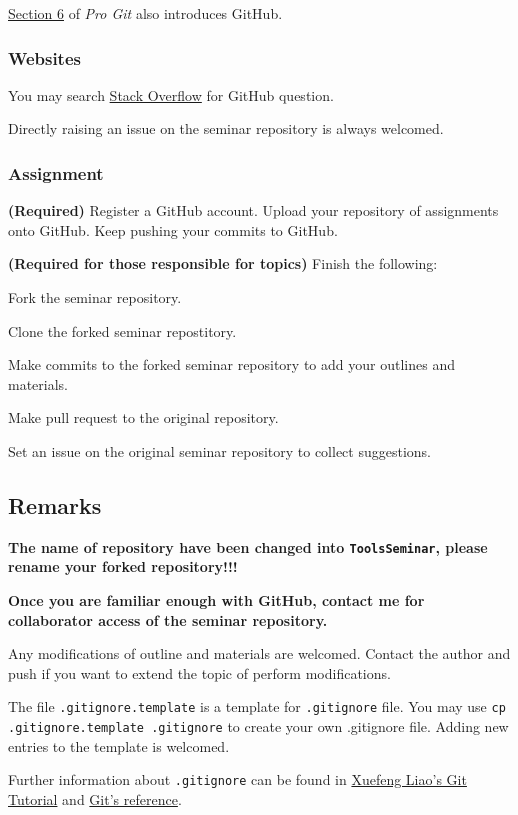 \documentclass[english]{pkupaper}
\begin{document}
\href{https://git-scm.com/book/en/v2/GitHub-Account-Setup-and-Configuration}{Section 6} of \emph{Pro Git} also introduces GitHub.

\subsubsection{Websites}

You may search \href{https://stackoverflow.com/}{Stack Overflow} for GitHub question.

Directly raising an issue on the seminar repository is always welcomed.

\subsubsection{Assignment}

\begin{thmquestion}
\textbf{(Required)} Register a GitHub account. Upload your repository of assignments onto GitHub. Keep pushing your commits to GitHub.
\end{thmquestion}

\begin{thmquestion}
\textbf{(Required for those responsible for topics)} Finish the following:
\begin{partlist}
\item Fork the seminar repository.
\item Clone the forked seminar repostitory.
\item Make commits to the forked seminar repository to add your outlines and materials.
\item Make pull request to the original repository.
\item Set an issue on the original seminar repository to collect suggestions.
\end{partlist}
\end{thmquestion}

\subsection{Remarks}

\textbf{The name of repository have been changed into \texttt{ToolsSeminar}, please rename your forked repository!!!}

\textbf{Once you are familiar enough with GitHub, contact me for collaborator access of the seminar repository.}

Any modifications of outline and materials are welcomed. Contact the author and push if you want to extend the topic of perform modifications.

The file \verb".gitignore.template" is a template for \verb".gitignore" file. You may use \verb"cp .gitignore.template .gitignore" to create your own .gitignore file. Adding new entries to the template is welcomed.

Further information about \verb".gitignore" can be found in \href{https://www.liaoxuefeng.com/wiki/0013739516305929606dd18361248578c67b8067c8c017b000/0013758404317281e54b6f5375640abbb11e67be4cd49e0000}{Xuefeng Liao's Git Tutorial} and \href{https://git-scm.com/docs/gitignore}{Git's reference}.

	
\end{document}
